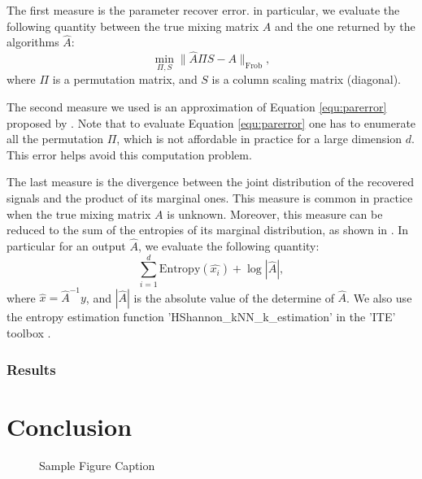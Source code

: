 \documentclass[twoside]{article}
\theoremstyle{definition}
\begin{document}
The first measure is the parameter recover error. in particular, we evaluate the following quantity between the true mixing matrix $A$ and the one returned by the algorithms $\widehat{A}$:
\begin{equation}
\label{equ:parerror}
\min_{\Pi,S} \|\widehat{A}\Pi S - A\|_{\text{Frob}},
\end{equation}
where $\Pi$ is a permutation matrix, and $S$ is a column scaling matrix (diagonal).

The second measure we used is an approximation of Equation \eqref{equ:parerror} proposed by \citet{comon1994independent}. 
Note that to evaluate Equation \eqref{equ:parerror} one has to enumerate all the permutation $\Pi$, which is not affordable in practice for a large dimension $d$. 
This error helps avoid this computation problem. 

The last measure is the divergence between the joint distribution of the recovered signals and the product of its marginal ones. 
This measure is common in practice when the true mixing matrix $A$ is unknown. 
Moreover, this measure can be reduced to the sum of the entropies of its marginal distribution, as shown in \cite{Learned-Miller:2003:IUS:945365.964306}. 
In particular for an output $\widehat{A}$, we evaluate the following quantity:
\begin{equation}
\sum_{i = 1}^{d} \text{Entropy}(\widehat{x_i}) + \log |\widehat{A}|,
\end{equation}
where $\widehat{x} = \widehat{A}^{-1}y$, and $|\widehat{A}|$ is the absolute value of the determine of $\widehat{A}$. We also use the entropy estimation function 'HShannon\_kNN\_k\_estimation' in the 'ITE' toolbox \cite{szabo14information}.

\subsubsection{Results}


\section{Conclusion}

\begin{figure}[h]
\vspace{.3in}
\centerline{}
\vspace{.3in}
\caption{Sample Figure Caption}
\end{figure}
\end{document}
